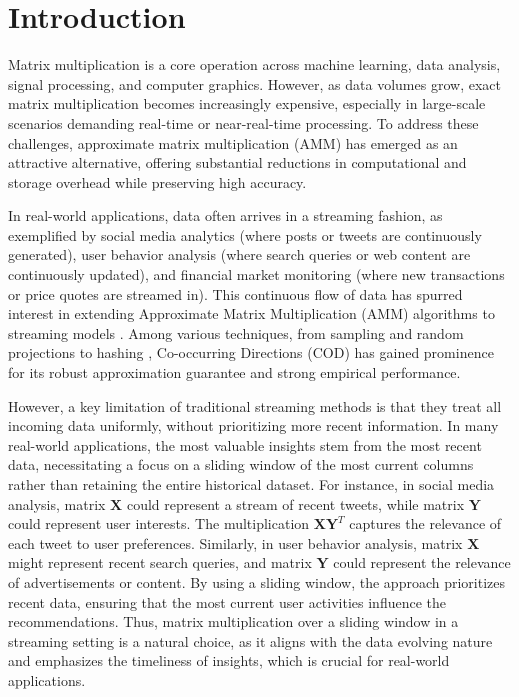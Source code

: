 \section{Introduction}
\label{sec:sec-Introduction}

Matrix multiplication is a core operation across machine learning, data analysis, signal processing, and computer graphics. However, as data volumes grow, exact matrix multiplication becomes increasingly expensive, especially in large-scale scenarios demanding real-time or near-real-time processing. To address these challenges, approximate matrix multiplication (AMM) has emerged as an attractive alternative, offering substantial reductions in computational and storage overhead while preserving high accuracy.


In real-world applications, data often arrives in a streaming fashion, as exemplified by social media analytics (where posts or tweets are continuously generated), user behavior analysis (where search queries or web content are continuously updated), and financial market monitoring (where new transactions or price quotes are streamed in). This continuous flow of data has spurred interest in extending Approximate Matrix Multiplication (AMM) algorithms to streaming models \cite{MrouehMG17, YeLZ16}. Among various techniques, from sampling \cite{DrineasKM06} and random projections \cite{CohenNW16,MagenZ11,Sarlos06} to hashing \cite{ClarksonW13}, Co-occurring Directions (COD) \cite{MrouehMG17} has gained prominence for its robust approximation guarantee and strong empirical performance. 

However, a key limitation of traditional streaming methods is that they treat all incoming data uniformly, without prioritizing more recent information. In many real-world applications, the most valuable insights stem from the most recent data, necessitating a focus on a sliding window of the most current columns rather than retaining the entire historical dataset. For instance, in social media analysis, matrix \( \boldsymbol{X} \) could represent a stream of recent tweets, while matrix \(\boldsymbol{Y} \) could represent user interests. The multiplication \( \boldsymbol{X}  \boldsymbol{Y}^T \) captures the relevance of each tweet to user preferences. Similarly, in user behavior analysis, matrix \( \boldsymbol{X} \) might represent recent search queries, and matrix \( \boldsymbol{Y} \) could represent the relevance of advertisements or content. By using a sliding window, the approach prioritizes recent data, ensuring that the most current user activities influence the recommendations. Thus, matrix multiplication over a sliding window in a streaming setting is a natural choice, as it aligns with the data evolving nature and emphasizes the timeliness of insights, which is crucial for real-world applications.



